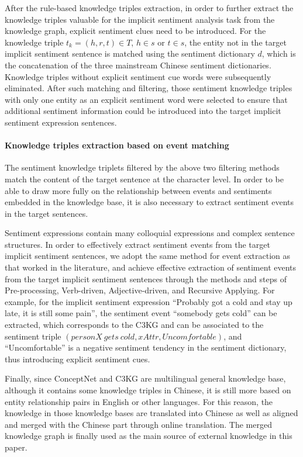 After the rule-based knowledge triples extraction, in order to further extract the knowledge triples valuable for the implicit sentiment analysis task from the knowledge graph, explicit sentiment clues need to be introduced.
For the knowledge triple $t_k = (h, r, t) \in T$, $ h \in s $ or $ t \in s $, the entity not in the target implicit sentiment sentence is matched using the sentiment dictionary $d$, which is the concatenation of the three mainstream Chinese sentiment dictionaries. Knowledge triples without explicit sentiment cue words were subsequently eliminated.
After such matching and filtering, those sentiment knowledge triples with only one entity as an explicit sentiment word were selected to ensure that additional sentiment information could be introduced into the target implicit sentiment expression sentences.

\paragraph{Knowledge triples extraction based on event matching}

The sentiment knowledge triplets filtered by the above two filtering methods match the content of the target sentence at the character level. In order to be able to draw more fully on the relationship between events and sentiments embedded in the knowledge base, it is also necessary to extract sentiment events in the target sentences.

Sentiment expressions contain many colloquial expressions and complex sentence structures. In order to effectively extract sentiment events from the target implicit sentiment sentences, we adopt the same method for event extraction as that worked in the literature, and achieve effective extraction of sentiment events from the target implicit sentiment sentences through the methods and steps of Pre-processing, Verb-driven, Adjective-driven, and Recursive Applying.
For example, for the implicit sentiment expression ``Probably got a cold and stay up late, it is still some pain'', the sentiment event ``somebody gets cold'' can be extracted, which corresponds to the C3KG and can be associated to the sentiment triple $(personX\ gets\ cold, xAttr, Uncomfortable)$, and ``Uncomfortable'' is a negative sentiment tendency in the sentiment dictionary, thus introducing explicit sentiment cues.

Finally, since ConceptNet and C3KG are multilingual general knowledge base, although it contains some knowledge triples in Chinese, it is still more based on entity relationship pairs in English or other languages. For this reason, the knowledge in those knowledge bases are translated into Chinese as well as aligned and merged with the Chinese part through online translation. The merged knowledge graph is finally used as the main source of external knowledge in this paper.


